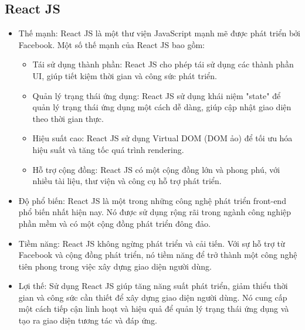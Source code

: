 \documentclass[../Thesis.tex]{subfiles}
\begin{document}
		\subsection{React JS}
			\begin{itemize}
				\item Thế mạnh: React JS là một thư viện JavaScript mạnh mẽ được phát triển bởi Facebook. Một số thế mạnh của React JS bao gồm:
				\begin{itemize}
					\item Tái sử dụng thành phần: React JS cho phép tái sử dụng các thành phần UI, giúp tiết kiệm thời gian và công sức phát triển.
					\item Quản lý trạng thái ứng dụng: React JS sử dụng khái niệm "state" để quản lý trạng thái ứng dụng một cách dễ dàng, giúp cập nhật giao diện theo thời gian thực.
					\item Hiệu suất cao: React JS sử dụng Virtual DOM (DOM ảo) để tối ưu hóa hiệu suất và tăng tốc quá trình rendering.
					\item Hỗ trợ cộng đồng: React JS có một cộng đồng lớn và phong phú, với nhiều tài liệu, thư viện và công cụ hỗ trợ phát triển.
				\end{itemize}
				\item Độ phổ biến: React JS là một trong những công nghệ phát triển front-end phổ biến nhất hiện nay. Nó được sử dụng rộng rãi trong ngành công nghiệp phần mềm và có một cộng đồng phát triển đông đảo.
				
				\item Tiềm năng: React JS không ngừng phát triển và cải tiến. Với sự hỗ trợ từ Facebook và cộng đồng phát triển, nó tiềm năng để trở thành một công nghệ tiên phong trong việc xây dựng giao diện người dùng.
				
				\item Lợi thế: Sử dụng React JS giúp tăng năng suất phát triển, giảm thiểu thời gian và công sức cần thiết để xây dựng giao diện người dùng. Nó cung cấp một cách tiếp cận linh hoạt và hiệu quả để quản lý trạng thái ứng dụng và tạo ra giao diện tương tác và đáp ứng.
			\end{itemize}
\end{document}
